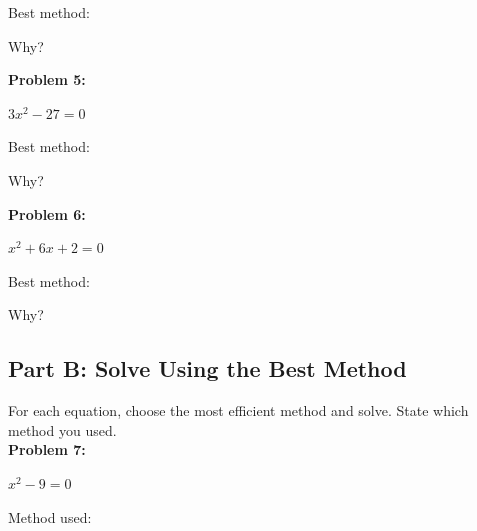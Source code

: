 \documentclass[12pt]{article}
\begin{document}
			Best method: \underline{\hspace{3in}}

			\vspace{0.5cm}

			Why? \underline{\hspace{4in}}

			\vspace{1cm}

			\textbf{Problem 5:}
            
            $3x^2 - 27 = 0$

			\vspace{2cm}

			Best method: \underline{\hspace{3in}}

			\vspace{0.5cm}

			Why? \underline{\hspace{4in}}

			\vspace{1cm}

			\textbf{Problem 6:}
            
            $x^2 + 6x + 2 = 0$

			\vspace{2cm}

			Best method: \underline{\hspace{3in}}

			\vspace{0.5cm}

			Why? \underline{\hspace{4in}}

			\newpage

		\subsection*{Part B: Solve Using the Best Method}

			For each equation, choose the most efficient method and solve. State which method you used.\\

			\textbf{Problem 7:}
            
            $x^2 - 9 = 0$

			\vspace{3.7cm}

			Method used: \underline{\hspace{2in}}

			\vspace{1cm}
\end{document}
